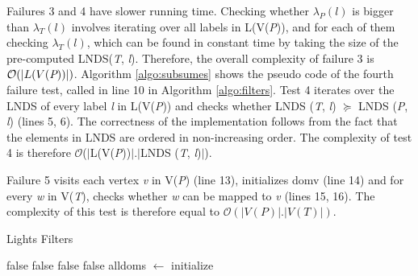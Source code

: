 \documentclass{l4proj}
\begin{document}
Failures 3 and 4 have slower running time. Checking whether $\lambda_{P}(l)$ is bigger than $\lambda_{T}(l)$ involves iterating over all labels in L(V(\emph{P})), and for each of them checking $\lambda_{T}(l)$, which can be found in constant time by taking the size of the pre-computed LNDS(\emph{T}, \emph{l}). Therefore, the overall complexity of failure 3 is $\mathcal{O}(|L(V(\emph{P}))|)$. Algorithm \ref{algo:subsumes} shows the pseudo code of the fourth failure test, called in line 10 in Algorithm \ref{algo:filters}. Test 4 iterates over the LNDS of every label \emph{l} in L(V(\emph{P})) and checks whether LNDS (\emph{T}, \emph{l}) $\succeq$ LNDS (\emph{P}, \emph{l}) (lines 5, 6). The correctness of the implementation follows from the fact that the elements in LNDS are ordered in non-increasing order. The complexity of test 4 is therefore $\mathcal{O}$($|$L(V(\emph{P}))$|.|$LNDS (\emph{T}, \emph{l})$|$).

Failure 5 visits each vertex \emph{v} in V(\emph{P}) (line 13), initializes domv (line 14) and for every \emph{w} in V(\emph{T}), checks whether \emph{w} can be mapped to \emph{v} (lines 15, 16). The complexity of this test is therefore equal to $\mathcal{O}(|V(P)|.|V(T)|)$.
\begin{algorithm}
\centering
\caption{Lights Filters}
\label{algo:filters}
\begin{algorithmic}[1]
 \Return false 
\EndIf
{} \Return false 
\EndIf
{}
	 \Return false \EndIf {}
\EndFor
{} \Return false \EndIf {}
\State alldoms $\gets$ initialize 
\EndFor \\
 
\EndProcedure
\end{algorithmic}
\end{algorithm}
\end{document}
